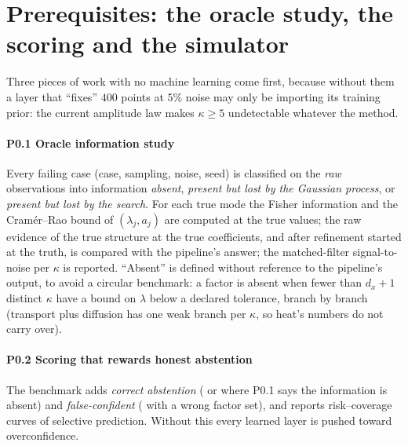 \section{Prerequisites: the oracle study, the scoring and the simulator}\label{sec:p0}
Three pieces of work with no machine learning come first, because without them a layer that ``fixes'' $400$ points at $5\%$ noise may only be importing its training prior: the current amplitude law makes $\kappa\ge5$ undetectable whatever the method.

\paragraph{P0.1 Oracle information study} Every failing case (case, sampling, noise, seed) is classified on the \emph{raw} observations into information \emph{absent}, \emph{present but lost by the Gaussian process}, or \emph{present but lost by the search}.
For each true mode the Fisher information and the Cram\'er--Rao bound of $(\lambda_j,a_j)$ are computed at the true values; the raw evidence of the true structure at the true coefficients, and after refinement started at the truth, is compared with the pipeline's answer; the matched-filter signal-to-noise per $\kappa$ is reported.
``Absent'' is defined without reference to the pipeline's output, to avoid a circular benchmark: a factor is absent when fewer than $d_x+1$ distinct $\kappa$ have a bound on $\lambda$ below a declared tolerance, branch by branch (transport plus diffusion has one weak branch per $\kappa$, so heat's numbers do not carry over).

\paragraph{P0.2 Scoring that rewards honest abstention} The benchmark adds \emph{correct abstention} (\IDK{} or \UND{} where P0.1 says the information is absent) and \emph{false-confident} (\FC{} with a wrong factor set), and reports risk--coverage curves of selective prediction.
Without this every learned layer is pushed toward overconfidence.


